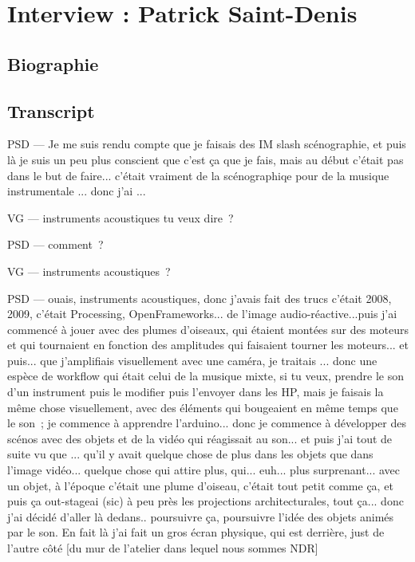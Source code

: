 \chapter{Interview : Patrick Saint-Denis}

\section*{Biographie}


\section*{Transcript}

PSD — Je me suis rendu compte que je faisais des IM slash scénographie, et puis là je suis un peu plus conscient que c'est ça que je fais, mais au début c'était pas dans le but de faire... c'était vraiment de la scénographiqe pour de la musique instrumentale ... donc j'ai ... 

VG — instruments acoustiques tu veux dire ? 

PSD — comment ? 

VG — instruments acoustiques ? 

PSD — ouais, instruments acoustiques, donc j'avais fait des trucs c'était 2008, 2009, c'était Processing, OpenFrameworks... de l'image audio-réactive...puis j'ai commencé à jouer avec des plumes d'oiseaux, qui étaient montées sur des moteurs et qui tournaient en fonction des amplitudes qui faisaient tourner les moteurs... et puis... que j'amplifiais visuellement avec une caméra, je traitais ... donc une espèce de workflow qui était celui de la musique mixte, si tu veux, prendre le son d'un instrument puis le modifier puis l'envoyer dans les HP, mais je faisais la même chose visuellement, avec des éléments qui bougeaient en même temps que le son ; je commence à apprendre l'arduino... donc je commence à développer des scénos avec des objets et de la vidéo qui réagissait au son... et puis j'ai tout de suite vu que ... qu'il y avait quelque chose de plus dans les objets que dans l'image vidéo... quelque chose qui attire plus, qui... euh... plus surprenant... avec un objet, à l'époque c'était une plume d'oiseau, c'était tout petit comme ça, et puis ça out-stageai (sic) à peu près les projections architecturales, tout ça... donc j'ai décidé d'aller là dedans.. poursuivre ça, poursuivre l'idée des objets animés par le son. En fait là j'ai fait un gros écran physique, qui est derrière, just de l'autre côté [du mur de l'atelier dans lequel nous sommes NDR]  


